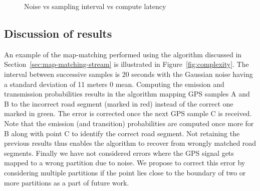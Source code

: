 \documentclass{wscpaperproc}
\theoremstyle{wsc}
\begin{document}
\begin{figure}[h]
 \centering
{}
\caption{Noise vs sampling interval vs compute latency}
 \label{fig:latency}
\end{figure}




\subsection{Discussion of results}
\label{subsec:result-discuss}

 An example of the map-matching performed using the algorithm discussed in Section~\ref{sec:map-matching-stream} is illustrated in Figure~\ref{fig:complexity}. The interval between successive samples is 20 seconds with the Gaussian noise having a standard deviation of 11 meters 0 mean. Computing the emission and transmission probabilities results in the algorithm mapping GPS samples A and B to the incorrect road segment (marked in red) instead of the correct one marked in green. The error is corrected once the next GPS sample C is received. Note that the emission (and transition) probabilities  are computed once more for B  along with point C to identify the correct road segment. Not retaining the previous results thus enables the algorithm to recover from wrongly matched road segments. Finally we have not considered errors where the GPS signal gets mapped to a wrong partition due to noise. We propose to correct this error by considering multiple partitions if the point lies close to the boundary of two or more partitions as a part of future work.
\end{document}
